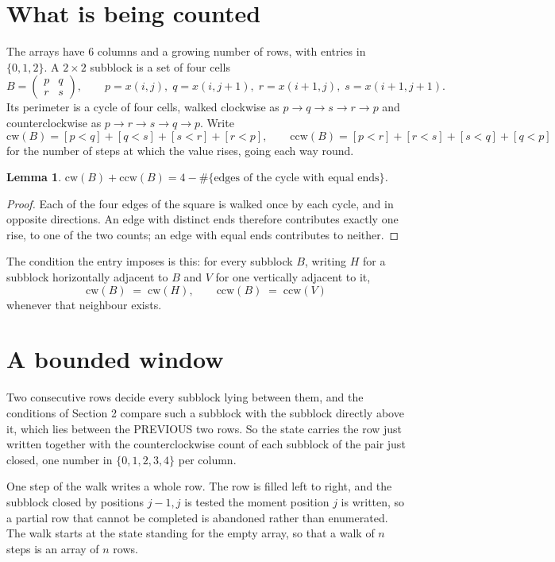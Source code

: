 \documentclass[11pt,a4paper]{article}
\theoremstyle{plain}
\newtheorem{lemma}[theorem]{Lemma}
\theoremstyle{definition}
\begin{document}
\section{What is being counted}

The arrays have $6$ columns and a growing number of rows, with entries in $\{0,1,2\}$. A
$2\times2$ subblock is a set of four cells
\[
B=\begin{pmatrix} p & q \\ r & s \end{pmatrix},
\qquad p=x(i,j),\; q=x(i,j+1),\; r=x(i+1,j),\; s=x(i+1,j+1).
\]
Its perimeter is a cycle of four cells, walked clockwise as $p\to q\to s\to r\to p$ and
counterclockwise as $p\to r\to s\to q\to p$. Write
\[
\mathrm{cw}(B)=[p<q]+[q<s]+[s<r]+[r<p],\qquad
\mathrm{ccw}(B)=[p<r]+[r<s]+[s<q]+[q<p]
\]
for the number of steps at which the value rises, going each way round.

\begin{lemma}\label{lem:sum}
$\mathrm{cw}(B)+\mathrm{ccw}(B)=4-\#\{\text{edges of the cycle with equal ends}\}$.
\end{lemma}

\begin{proof}
Each of the four edges of the square is walked once by each cycle, and in opposite directions.
An edge with distinct ends therefore contributes exactly one rise, to one of the two counts;
an edge with equal ends contributes to neither.
\end{proof}

The condition the entry imposes is this: for every subblock $B$, writing $H$ for a subblock horizontally adjacent to $B$ and $V$ for one vertically adjacent to it,
\[
\mathrm{cw}(B)\;=\;\mathrm{cw}(H),\qquad \mathrm{ccw}(B)\;=\;\mathrm{ccw}(V)
\]
whenever that neighbour exists.

\section{A bounded window}

Two consecutive rows decide every subblock lying between them, and the conditions of Section 2 compare such a subblock with the subblock directly above it, which lies between the PREVIOUS two rows. So the state carries the row just written together with the counterclockwise count of each subblock of the pair just closed, one number in $\{0,1,2,3,4\}$ per column.

One step of the walk writes a whole row. The row is filled left to right, and the subblock
closed by positions $j-1,j$ is tested the moment position $j$ is written, so a partial row that
cannot be completed is abandoned rather than enumerated. The walk starts at the state standing
for the empty array, so that a walk of $n$ steps is an array of $n$ rows.
\end{document}
